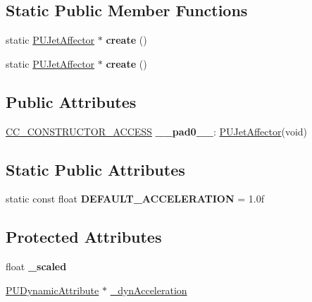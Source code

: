 \subsection*{Static Public Member Functions}
\begin{DoxyCompactItemize}
\item 
\mbox{\label{classPUJetAffector_a2544a134887182f4b89250618cec473d}} 
static \hyperlink{classPUJetAffector}{P\+U\+Jet\+Affector} $\ast$ {\bfseries create} ()
\item 
\mbox{\label{classPUJetAffector_aacfa560fb40f07a986b1fc3eb6e34cfe}} 
static \hyperlink{classPUJetAffector}{P\+U\+Jet\+Affector} $\ast$ {\bfseries create} ()
\end{DoxyCompactItemize}
\subsection*{Public Attributes}
\begin{DoxyCompactItemize}
\item 
\mbox{\label{classPUJetAffector_a93723820ac0abf9c69a4991a0d2ac9b2}} 
\hyperlink{_2cocos2d_2cocos_2base_2ccConfig_8h_a25ef1314f97c35a2ed3d029b0ead6da0}{C\+C\+\_\+\+C\+O\+N\+S\+T\+R\+U\+C\+T\+O\+R\+\_\+\+A\+C\+C\+E\+SS} {\bfseries \+\_\+\+\_\+pad0\+\_\+\+\_\+}\+: \hyperlink{classPUJetAffector}{P\+U\+Jet\+Affector}(void)
\end{DoxyCompactItemize}
\subsection*{Static Public Attributes}
\begin{DoxyCompactItemize}
\item 
\mbox{\label{classPUJetAffector_a95f7dcb2e200e5de8f944282df1339e9}} 
static const float {\bfseries D\+E\+F\+A\+U\+L\+T\+\_\+\+A\+C\+C\+E\+L\+E\+R\+A\+T\+I\+ON} = 1.\+0f
\end{DoxyCompactItemize}
\subsection*{Protected Attributes}
\begin{DoxyCompactItemize}
\item 
\mbox{\label{classPUJetAffector_a9298b17a2330e52c121ca7a8e82d36d6}} 
float {\bfseries \+\_\+scaled}
\item 
\hyperlink{classPUDynamicAttribute}{P\+U\+Dynamic\+Attribute} $\ast$ \hyperlink{classPUJetAffector_aeaa71f70b8a36196aadb301eae0f4a05}{\+\_\+dyn\+Acceleration}
\end{DoxyCompactItemize}
